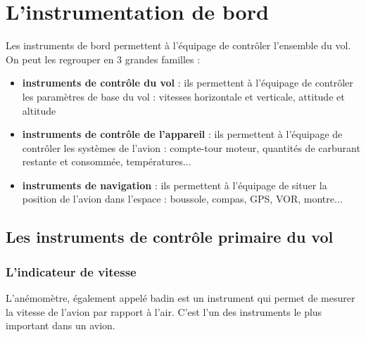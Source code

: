 %

\section{L'instrumentation de bord}
	Les instruments de bord permettent à l'équipage de contrôler l'ensemble du vol. On peut les regrouper en 3 grandes familles :
	\begin{itemize}
		\item \textbf{instruments de contrôle du vol} : ils permettent à l'équipage de contrôler les paramètres de base du vol : vitesses horizontale et verticale, attitude et altitude
		\item \textbf{instruments de contrôle de l'appareil} : ils permettent à l'équipage de contrôler les systèmes de l'avion : compte-tour moteur, quantités de carburant restante et consommée, températures...
		\item \textbf{instruments de navigation} : ils permettent à l'équipage de situer la position de l'avion dans l'espace : boussole, compas, GPS, VOR, montre...
	\end{itemize}
	
	\subsection{Les instruments de contrôle primaire du vol}
	\subsubsection{L'indicateur de vitesse}
	 L'\gls{anémomètre}, également appelé \gls{badin} est un instrument qui permet de mesurer la vitesse de l'avion par rapport à l'air. C'est l'un des instruments le plus important dans un avion. 

	\begin{figure}[H]	
	\centering
	\end{figure}
	
	
